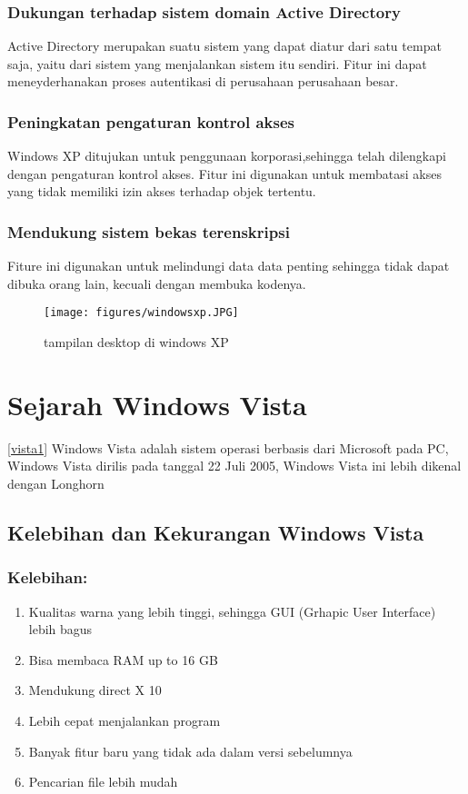 			\subsubsection{Dukungan terhadap sistem domain Active Directory} 
				Active Directory merupakan suatu sistem yang dapat diatur dari satu tempat saja, yaitu dari sistem yang menjalankan sistem itu sendiri. Fitur ini dapat meneyderhanakan 	proses autentikasi di perusahaan perusahaan besar.
			\subsubsection{Peningkatan pengaturan kontrol akses}
				Windows XP ditujukan untuk penggunaan korporasi,sehingga telah dilengkapi dengan pengaturan kontrol akses. Fitur ini digunakan untuk membatasi akses yang tidak memiliki izin akses terhadap objek tertentu.
			\subsubsection{Mendukung sistem bekas terenskripsi}
				Fiture ini digunakan untuk melindungi data data penting sehingga tidak dapat dibuka orang lain, kecuali dengan membuka kodenya.

\begin{figure}[ht]
\centerline{\texttt{[image: figures/windowsxp.JPG]}}
\caption{tampilan desktop di windows XP}
\label{windowsxp}
\end{figure}
	\section{Sejarah Windows Vista}
\ref{vista1}
		Windows Vista adalah sistem operasi berbasis dari Microsoft pada PC, Windows Vista dirilis pada tanggal 22 Juli 2005, Windows Vista ini lebih dikenal dengan Longhorn
	\subsection{Kelebihan dan Kekurangan Windows Vista}  \cite{russinovich2009windows}
		\subsubsection{Kelebihan:}
\begin{enumerate}
			\item Kualitas warna yang lebih tinggi, sehingga GUI (Grhapic User Interface) lebih bagus
			\item Bisa membaca RAM up to 16 GB
			\item Mendukung direct X 10
			\item Lebih cepat menjalankan program
			\item Banyak fitur baru yang tidak ada dalam versi sebelumnya
			\item Pencarian file lebih mudah 
\end{enumerate}
